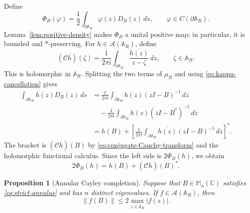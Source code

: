 \documentclass[preprints,article,submit,oneauthor]{Definitions/mdpi}
\newcounter{manuscriptresult}[section]
\theoremstyle{mdpi}
\newtheorem{proposition}[manuscriptresult]{Proposition}
\theoremstyle{definition}
\newcommand{\C}{\mathbb C}
\newcommand{\Mn}{\mathbb M_n(\C)}
\newcommand{\iu}{\mathrm{i}}
\begin{document}
Define
\begin{equation}
  \Phi_B(\varphi)
  =\frac12\int_{\partial\mathbb A_R}
  \varphi(z)D_B(z)\,ds,
  \qquad
  \varphi\in C(\partial\mathbb A_R).
  \label{eq:positive-map}
\end{equation}
Lemma~\ref{lem:positive-density} makes $\Phi_B$ a unital positive map;
in particular, it is bounded and $*$-preserving.  For
$h\in\mathcal A(\mathbb A_R)$, define
\begin{equation}
  (\mathcal C\overline h)(\zeta)
  =\frac1{2\pi\iu}
  \int_{\partial\mathbb A_R}
  \frac{\overline{h(z)}}{z-\zeta}\,dz,
  \qquad \zeta\in\mathbb A_R.
  \label{eq:conjugate-Cauchy-transform}
\end{equation}
This is holomorphic in $\mathbb A_R$.  Splitting the two terms of
$\mu_B$ and using \eqref{eq:kappa-cancellation} gives
\begin{align*}
  \int_{\partial\mathbb A_R}h(z)D_B(z)\,ds
  &=\frac1{2\pi\iu}\int_{\partial\mathbb A_R}
  h(z)(zI-B)^{-1}\,dz\\
  &\quad-\frac1{2\pi\iu}\int_{\partial\mathbb A_R}
  h(z)(\overline zI-B^*)^{-1}\,d\overline z\\
  &=h(B)+
  \left[\frac1{2\pi\iu}\int_{\partial\mathbb A_R}
  \overline{h(z)}(zI-B)^{-1}\,dz\right]^*.
\end{align*}
The bracket is $(\mathcal C\overline h)(B)$ by
\eqref{eq:conjugate-Cauchy-transform} and the holomorphic functional
calculus.  Since the left side is $2\Phi_B(h)$, we obtain
\begin{equation}
  2\Phi_B(h)=h(B)+(\mathcal C\overline h)(B)^*.
  \label{eq:symmetrized-calculus}
\end{equation}

\begin{proposition}[Annular Cayley completion]
\label{prop:annular-completion}
Suppose that $B\in\Mn$ satisfies \eqref{eq:strict-annulus} and has
$n$ distinct eigenvalues.  If $f\in\mathcal A(\mathbb A_R)$, then
\begin{equation}
  \lVert f(B)\rVert
  \leq2\max_{z\in\overline{\mathbb A}_R}\lvert f(z)\rvert.
  \label{eq:simple-spectrum-estimate}
\end{equation}
\end{proposition}
\end{document}
